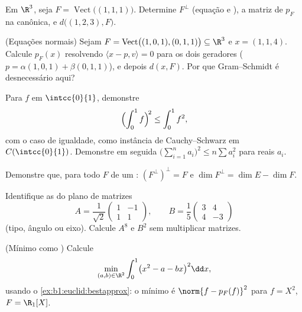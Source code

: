 \begin{exercise}[$\star$]\label{exo:b1:euclid:4}
Em $\R^3$, seja $F = \operatorname{Vect}\bigl((1,1,1)\bigr)$. Determine $F^\perp$ (equação e ), a
matriz de $p_F$ na  canônica, e $d\bigl((1, 2, 3), F\bigr)$.
\end{exercise}

\begin{exercise}[$\star\star$]\label{exo:b1:euclid:5}
(Equações normais) Sejam $F =
\operatorname{Vect}\bigl((1,0,1),(0,1,1)\bigr) \subseteq \R^3$ e $x = (1, 1, 4)$. Calcule $p_F(x)$ resolvendo
$\langle x - p, v
\rangle = 0$ para os dois geradores ($p = \alpha(1,0,1) +
\beta(0,1,1)$), e depois $d(x, F)$. Por que
Gram--Schmidt é desnecessário aqui?
\end{exercise}

\begin{exercise}[$\star\star$]\label{exo:b1:euclid:6}
Para $f$  em $\intcc{0}{1}$, demonstre
\[
\Bigl(\int_0^1 f\Bigr)^{\!2} \leq \int_0^1 f^2 ,
\]
com o caso de igualdade, como instância de Cauchy--Schwarz em $C(\intcc{0}{1})$.
Demonstre em seguida $\bigl(\sum_{i=1}^n a_i\bigr)^2 \leq
n \sum a_i^2$ para reais $a_i$.
\end{exercise}

\begin{exercise}[$\star\star$]\label{exo:b1:euclid:7}
Demonstre que, para todo  $F$ de um :
$(F^{\perp})^{\perp} = F$ e $\dim F^{\perp} = \dim E - \dim F$.
\end{exercise}

\begin{exercise}[$\star\star$]\label{exo:b1:euclid:8}
Identifique as  do plano de matrizes
\[
A = \frac{1}{\sqrt 2}\begin{pmatrix} 1 & -1\\ 1 & 1\end{pmatrix},
\qquad
B = \frac{1}{5}\begin{pmatrix} 3 & 4\\ 4 & -3\end{pmatrix}
\]
(tipo, ângulo ou eixo). Calcule $A^8$ e $B^2$ sem multiplicar
matrizes.
\end{exercise}

\begin{exercise}[$\star\star\star$]\label{exo:b1:euclid:9}
(Mínimo como ) Calcule
\[
\min_{(a, b) \in \R^2} \int_0^1 \bigl(x^2 - a - bx\bigr)^2 \dd x ,
\]
usando o \cref{ex:b1:euclid:bestapprox}: o mínimo é $\norm{f -
p_F(f)}^2$ para $f = X^2$, $F = \R_1[X]$.
\end{exercise}

